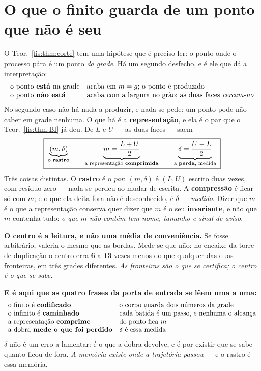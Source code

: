 \documentclass[livro.tex]{subfiles}
\begin{document}
\section{O que o finito guarda de um ponto que não é seu}\label{fis:rastro}

\noindent O Teor.~\ref{fis:thm:corte} tem uma hipótese que é preciso ler: o ponto
onde o processo pára é um ponto \emph{da grade}. Há um segundo desfecho, e é ele
que dá a interpretação:
\[
\begin{array}{ll}
\text{o ponto \textbf{está} na grade} & \text{acaba em }m=g\text{; o ponto é produzido}\\
\text{o ponto \textbf{não está}} & \text{acaba com a largura no grão; as duas faces \emph{cercam-no}}
\end{array}
\]
No segundo caso não há nada a produzir, e nada se pede: um ponto pode não caber
em grade nenhuma. O que há é a \textbf{representação}, e ela é o par que o
Teor.~\ref{fis:thm:BI} já deu. De $L$ e $U$ --- as duas faces --- saem
\[
\boxed{\;
\underbrace{(m,\delta)}_{\text{o \textbf{rastro}}}
\qquad
\underbrace{m=\frac{L+U}{2}}_{\text{a representação \textbf{comprimida}}}
\qquad
\underbrace{\delta=\frac{U-L}{2}}_{\text{a \textbf{perda}, medida}}
\;}
\]
Três coisas distintas. O \textbf{rastro} é o \emph{par}: $(m,\delta)$ é $(L,U)$
escrito duas vezes, com resíduo zero --- nada se perdeu ao mudar de escrita. A
\textbf{compressão} é ficar só com $m$; e o que ela deita fora não é
desconhecido, é $\delta$ --- \emph{medido}. Dizer que $m$ é o que a representação
conserva quer dizer que $m$ é o seu \textbf{invariante}, e não que $m$ contenha
tudo: \emph{o que $m$ não contém tem nome, tamanho e sinal de aviso}.

\medskip\noindent\textbf{O centro é a leitura, e não uma média de conveniência.}
Se fosse arbitrário, valeria o mesmo que as bordas. Mede-se que não: no encaixe
da torre de duplicação o centro erra $\mathbf{6}$ a $\mathbf{13}$ vezes menos do
que qualquer das duas fronteiras, em três grades diferentes. \emph{As fronteiras
são o que se certifica; o centro é o que se sabe.}

\medskip\noindent\textbf{E é aqui que as quatro frases da porta de entrada se
lêem uma a uma:}
\[
\begin{array}{ll}
\text{o finito é \textbf{codificado}} & \text{o corpo guarda dois números da grade}\\
\text{o infinito é \textbf{caminhado}} & \text{cada batida é um passo, e nenhuma o alcança}\\
\text{a representação \textbf{comprime}} & \text{do ponto fica }m\\
\text{a dobra \textbf{mede o que foi perdido}} & \delta\ \text{é essa medida}
\end{array}
\]
$\delta$ não é um erro a lamentar: é o que a dobra devolve, e é por existir que se
sabe quanto ficou de fora. \emph{A memória existe onde a trajetória passou} --- e
o rastro é essa memória.
\end{document}

